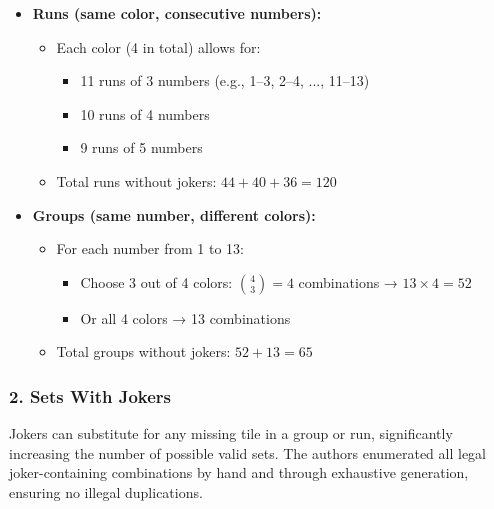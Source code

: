 \documentclass[11pt,letterpaper]{article}
\begin{document}
\begin{itemize}
    \item \textbf{Runs (same color, consecutive numbers):}
    \begin{itemize}
        \item Each color (4 in total) allows for:
        \begin{itemize}
            \item 11 runs of 3 numbers (e.g., 1--3, 2--4, ..., 11--13)
            \item 10 runs of 4 numbers
            \item 9 runs of 5 numbers
        \end{itemize}
        \item Total runs without jokers: $44 + 40 + 36 = 120$
    \end{itemize}

    \item \textbf{Groups (same number, different colors):}
    \begin{itemize}
        \item For each number from 1 to 13:
        \begin{itemize}
            \item Choose 3 out of 4 colors: $\binom{4}{3} = 4$ combinations → $13 \times 4 = 52$
            \item Or all 4 colors → 13 combinations
        \end{itemize}
        \item Total groups without jokers: $52 + 13 = 65$
    \end{itemize}
\end{itemize}

\subsubsection*{2. Sets With Jokers}

Jokers can substitute for any missing tile in a group or run, significantly increasing the number of possible valid sets. The authors enumerated all legal joker-containing combinations by hand and through exhaustive generation, ensuring no illegal duplications.
\end{document}

